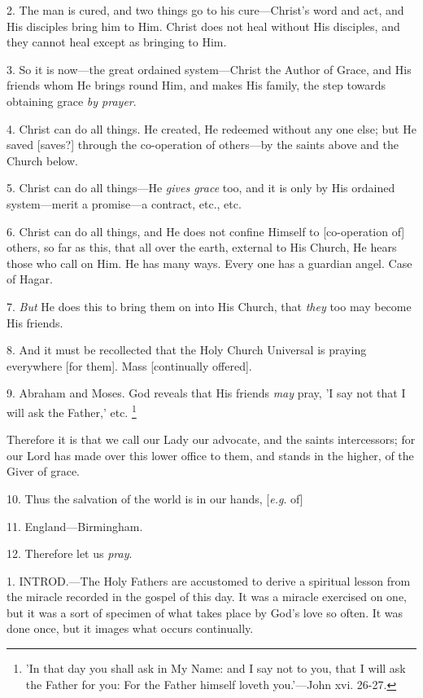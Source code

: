 2. The man is cured, and two things go to his
cure—Christ's word and act, and His disciples bring him to
Him. Christ does not heal without His disciples, and they cannot heal
except as bringing to Him.

3. So it is now—the great ordained
system—Christ the Author of Grace, and His friends whom He brings
round Him, and makes His family, the step towards obtaining grace \emph{by
prayer}.

4. Christ can do all things. He created, He
redeemed without any one else; but He saved [saves?] through the
co-operation of others—by the saints above and the Church below.

5. Christ can do all things—He \emph{gives grace}
too, and it is only by His ordained system—merit a promise—a
contract, etc., etc.

6. Christ can do all things, and He does not
confine Himself to [co-operation of] others, so far as this, that all
over the earth, external to His Church, He hears those who call on
Him. He has many ways. Every one has a guardian angel. Case of Hagar.

7. \emph{But} He does this to bring them on into
His Church, that \emph{they} too may become His friends.

8. And it must be recollected that the Holy
Church Universal is praying everywhere [for them]. Mass [continually
offered].

9. Abraham and Moses. God reveals that His
friends \emph{may} pray, 'I say not that I will ask the Father,' etc.
\footnote{'In that day you shall ask
in My Name: and I say not to you, that I will ask the Father for you:
For the Father himself loveth you.'—John xvi. 26-27.}

Therefore it is that we call our Lady our
advocate, and the saints intercessors; for our Lord has made over this lower office to them, and stands in the higher, of the Giver
of grace.

10. Thus the salvation of the world is in our
hands, [\emph{e.g}. of]

11. England—Birmingham.

12. Therefore let us \emph{pray}.


1. INTROD.—The
Holy Fathers are accustomed to derive a spiritual lesson from the
miracle recorded in the gospel of this day. It was a miracle exercised
on one, but it was a sort of specimen of what takes place by God's
love so often. It was done once, but it images what occurs
continually.

